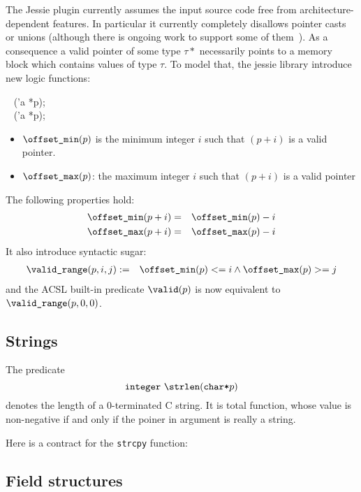 The Jessie plugin currently assumes the input source code free from
architecture-dependent features. In particular it currently completely
disallows pointer casts or unions (although there is ongoing work to
support some of them~\cite{moy07ccpp}). As a consequence a valid
pointer of some type $\tau*$ necessarily points to a memory block
which contains values of type $\tau$. To model that, the jessie library introduce new logic functions:
\begin{flushleft}
\integer ~ \offsetmin('a *p); \\
\integer ~ \offsetmax('a *p);
\end{flushleft}

\begin{itemize}
\item $\texttt{{\textbackslash}offset\_min}(p)$ is the minimum integer $i$ such that $(p+i)$ is a
  valid pointer.

\item $\texttt{{\textbackslash}offset\_max}(p)$: the maximum integer $i$ such that $(p+i)$ is a
  valid pointer
\end{itemize}
The following properties hold:
\begin{eqnarray*}
\texttt{{\textbackslash}offset\_min}(p+i) &=& \texttt{{\textbackslash}offset\_min}(p)-i \\
\texttt{{\textbackslash}offset\_max}(p+i) &=& \texttt{{\textbackslash}offset\_max}(p)-i
\end{eqnarray*}
It also introduce syntactic sugar:
\begin{eqnarray*}
\texttt{{\textbackslash}valid\_range}(p,i,j) &:=& \texttt{{\textbackslash}offset\_min}(p) <= i \land \texttt{{\textbackslash}offset\_max}(p) >= j 
\end{eqnarray*}
and the ACSL built-in predicate $\texttt{{\textbackslash}valid}(p)$ is now equivalent to
$\texttt{{\textbackslash}valid\_range}(p,0,0)$.

\subsection{Strings}

\experimental

The predicate 
\[
\integer~\strlen(\verb|char*|p)
\]
denotes the length of a 0-terminated C string. It is total function,
whose value is non-negative if and only if the poiner in argument is
really a string.

\begin{example}
  Here is a contract for the \verb|strcpy| function:
  

\end{example}

\subsection{Field structures}

